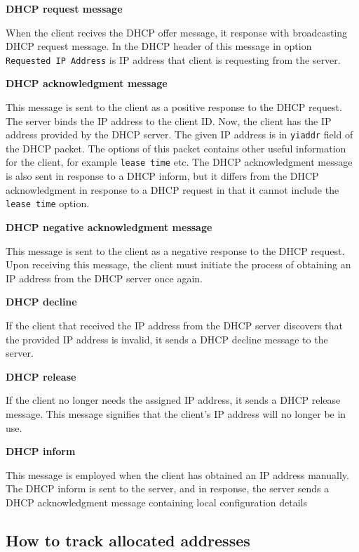 \documentclass[a4paper, 11pt, a4paper]{article}
\begin{document}
\noindent\large{\textbf{DHCP request message}}

When the client recives the DHCP offer message, it response with broadcasting DHCP request message. 
In the DHCP header of this message in option \texttt{Requested IP Address} is IP address that client is requesting from the server.
\bigskip

\noindent\large{\textbf{DHCP acknowledgment message}}

This message is sent to the client as a positive response to the DHCP request. The server binds the IP address to the client ID.
Now, the client has the IP address provided by the DHCP server. The given IP address is in \texttt{yiaddr} field of the DHCP packet. 
The options of this packet contains other useful information for the client, for example \texttt{lease time} etc.
The DHCP acknowledgment message is also sent in response to a DHCP inform, but it differs from the DHCP acknowledgment in response 
to a DHCP request in that it cannot include the \texttt{lease time} option.
\bigskip

\noindent\large{\textbf{DHCP negative acknowledgment message}}

This message is sent to the client as a negative response to the DHCP request. Upon receiving this message, the client must initiate 
the process of obtaining an IP address from the DHCP server once again.
\bigskip

\noindent\large{\textbf{DHCP decline}}

If the client that received the IP address from the DHCP server discovers that the provided IP address is invalid, it sends a DHCP decline 
message to the server.
\bigskip


\noindent\large{\textbf{DHCP release}}

If the client no longer needs the assigned IP address, it sends a DHCP release message. 
This message signifies that the client's IP address will no longer be in use.
\bigskip

\noindent\large{\textbf{DHCP inform}}

This message is employed when the client has obtained an IP address manually. 
The DHCP inform is sent to the server, and in response, the server sends a DHCP acknowledgment message containing local configuration details


\subsection{How to track allocated addresses}
\end{document}
